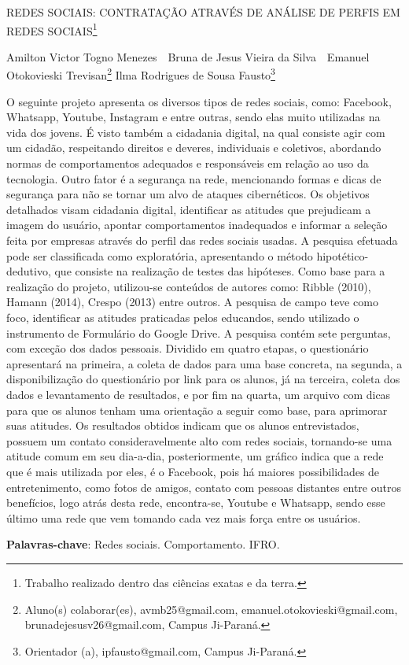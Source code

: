 \documentclass[article,12pt,onesidea,4paper,english,brazil]{abntex2}
\begin{document}
	
	
	\frenchspacing 
	
	\begin{center}
		\LARGE REDES SOCIAIS: CONTRATAÇÃO ATRAVÉS DE ANÁLISE DE PERFIS EM
		REDES SOCIAIS\footnote{Trabalho realizado dentro das ciências exatas e da terra.}
		
		\normalsize
		Amilton Victor Togno Menezes \,\, Bruna de Jesus Vieira da Silva \,\, Emanuel Otokovieski Trevisan\footnote{Aluno(s) colaborar(es), avmb25@gmail.com, emanuel.otokovieski@gmail.com,
			brunadejesusv26@gmail.com, Campus Ji-Paraná.} 
	Ilma Rodrigues de Sousa Fausto\footnote{Orientador (a), ipfausto@gmail.com, Campus Ji-Paraná.} 
	\end{center}
	
	\noindent O seguinte projeto apresenta os diversos tipos de redes sociais, como: Facebook,
	Whatsapp, Youtube, Instagram e entre outras, sendo elas muito utilizadas na vida
	dos jovens. É visto também a cidadania digital, na qual consiste agir com um
	cidadão, respeitando direitos e deveres, individuais e coletivos, abordando normas
	de comportamentos adequados e responsáveis em relação ao uso da tecnologia.
	Outro fator é a segurança na rede, mencionando formas e dicas de segurança para
	não se tornar um alvo de ataques cibernéticos. Os objetivos detalhados visam
	cidadania digital, identificar as atitudes que prejudicam a imagem do usuário,
	apontar comportamentos inadequados e informar a seleção feita por empresas
	através do perfil das redes sociais usadas. A pesquisa efetuada pode ser
	classificada como exploratória, apresentando o método hipotético-dedutivo, que
	consiste na realização de testes das hipóteses. Como base para a realização do
	projeto, utilizou-se conteúdos de autores como: Ribble (2010), Hamann (2014), Crespo
	(2013) entre outros. A pesquisa de campo teve como foco, identificar as atitudes
	praticadas pelos educandos, sendo utilizado o instrumento de Formulário do Google
	Drive. A pesquisa contém sete perguntas, com exceção dos dados pessoais.
	Dividido em quatro etapas, o questionário apresentará na primeira, a coleta de
	dados para uma base concreta, na segunda, a disponibilização do questionário por
	link para os alunos, já na terceira, coleta dos dados e levantamento de resultados, e
	por fim na quarta, um arquivo com dicas para que os alunos tenham uma orientação
	a seguir como base, para aprimorar suas atitudes. Os resultados obtidos indicam
	que os alunos entrevistados, possuem um contato consideravelmente alto com
	redes sociais, tornando-se uma atitude comum em seu dia-a-dia, posteriormente, um
	gráfico indica que a rede que é mais utilizada por eles, é o Facebook, pois há
	maiores possibilidades de entretenimento, como fotos de amigos, contato com
	pessoas distantes entre outros benefícios, logo atrás desta rede, encontra-se,
	Youtube e Whatsapp, sendo esse último uma rede que vem tomando cada vez mais
	força entre os usuários.
	
	\vspace{\onelineskip}
	
	\noindent
	\textbf{Palavras-chave}: Redes sociais. Comportamento. IFRO.
	
\end{document}
